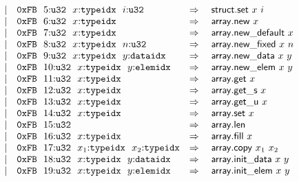 $$\begin{array}[t]{@{}lrrl@{}l@{}l@{}l@{}}
& & | & \mathtt{0xFB}~~5{:}{\mathtt{u32}}~~x{:}{\mathtt{typeidx}}~~i{:}{\mathtt{u32}} & \quad\Rightarrow\quad{} & \mathsf{struct{.}set}~x~i \\
& & | & \mathtt{0xFB}~~6{:}{\mathtt{u32}}~~x{:}{\mathtt{typeidx}} & \quad\Rightarrow\quad{} & \mathsf{array{.}new}~x \\
& & | & \mathtt{0xFB}~~7{:}{\mathtt{u32}}~~x{:}{\mathtt{typeidx}} & \quad\Rightarrow\quad{} & \mathsf{array{.}new\_default}~x \\
& & | & \mathtt{0xFB}~~8{:}{\mathtt{u32}}~~x{:}{\mathtt{typeidx}}~~n{:}{\mathtt{u32}} & \quad\Rightarrow\quad{} & \mathsf{array{.}new\_fixed}~x~n \\
& & | & \mathtt{0xFB}~~9{:}{\mathtt{u32}}~~x{:}{\mathtt{typeidx}}~~y{:}{\mathtt{dataidx}} & \quad\Rightarrow\quad{} & \mathsf{array{.}new\_data}~x~y \\
& & | & \mathtt{0xFB}~~10{:}{\mathtt{u32}}~~x{:}{\mathtt{typeidx}}~~y{:}{\mathtt{elemidx}} & \quad\Rightarrow\quad{} & \mathsf{array{.}new\_elem}~x~y \\
& & | & \mathtt{0xFB}~~11{:}{\mathtt{u32}}~~x{:}{\mathtt{typeidx}} & \quad\Rightarrow\quad{} & \mathsf{array{.}get}~x \\
& & | & \mathtt{0xFB}~~12{:}{\mathtt{u32}}~~x{:}{\mathtt{typeidx}} & \quad\Rightarrow\quad{} & {\mathsf{array{.}get}}{\mathsf{\_}}{\mathsf{s}}~x \\
& & | & \mathtt{0xFB}~~13{:}{\mathtt{u32}}~~x{:}{\mathtt{typeidx}} & \quad\Rightarrow\quad{} & {\mathsf{array{.}get}}{\mathsf{\_}}{\mathsf{u}}~x \\
& & | & \mathtt{0xFB}~~14{:}{\mathtt{u32}}~~x{:}{\mathtt{typeidx}} & \quad\Rightarrow\quad{} & \mathsf{array{.}set}~x \\
& & | & \mathtt{0xFB}~~15{:}{\mathtt{u32}} & \quad\Rightarrow\quad{} & \mathsf{array{.}len} \\
& & | & \mathtt{0xFB}~~16{:}{\mathtt{u32}}~~x{:}{\mathtt{typeidx}} & \quad\Rightarrow\quad{} & \mathsf{array{.}fill}~x \\
& & | & \mathtt{0xFB}~~17{:}{\mathtt{u32}}~~x_1{:}{\mathtt{typeidx}}~~x_2{:}{\mathtt{typeidx}} & \quad\Rightarrow\quad{} & \mathsf{array{.}copy}~x_1~x_2 \\
& & | & \mathtt{0xFB}~~18{:}{\mathtt{u32}}~~x{:}{\mathtt{typeidx}}~~y{:}{\mathtt{dataidx}} & \quad\Rightarrow\quad{} & \mathsf{array{.}init\_data}~x~y \\
& & | & \mathtt{0xFB}~~19{:}{\mathtt{u32}}~~x{:}{\mathtt{typeidx}}~~y{:}{\mathtt{elemidx}} & \quad\Rightarrow\quad{} & \mathsf{array{.}init\_elem}~x~y \\

\end{array}$$
